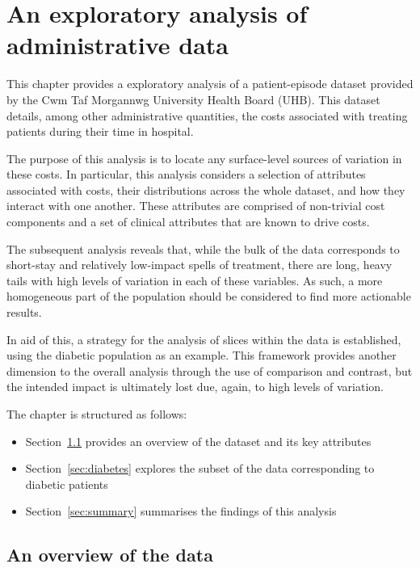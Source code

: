 \chapter{An exploratory analysis of administrative data}

\renewcommand{\texpath}{chapters/data/paper/tex}

This chapter provides a exploratory analysis of a patient-episode dataset
provided by the Cwm Taf Morgannwg University Health Board (UHB). This dataset
details, among other administrative quantities, the costs associated with
treating patients during their time in hospital.

The purpose of this analysis is to locate any surface-level sources of variation
in these costs. In particular, this analysis considers a selection of attributes
associated with costs, their distributions across the whole dataset, and how
they interact with one another. These attributes are comprised of non-trivial
cost components and a set of clinical attributes that are known to drive costs.

The subsequent analysis reveals that, while the bulk of the data corresponds to
short-stay and relatively low-impact spells of treatment, there are long, heavy
tails with high levels of variation in each of these variables. As such, a more
homogeneous part of the population should be considered to find more actionable
results.

In aid of this, a strategy for the analysis of slices within the data is
established, using the diabetic population as an example. This framework
provides another dimension to the overall analysis through the use of comparison
and contrast, but the intended impact is ultimately lost due, again, to high
levels of variation.

The chapter is structured as follows:
\begin{itemize}
    \item Section~\ref{sec:overview} provides an overview of the dataset and
        its key attributes
    \item Section~\ref{sec:diabetes} explores the subset of the data
        corresponding to diabetic patients
    \item Section~\ref{sec:summary} summarises the findings of this analysis
\end{itemize}

\section{An overview of the data}\label{sec:overview}
\graphicspath{{chapters/data/paper/img/external/}}

